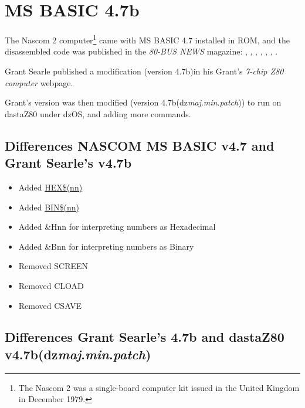 \section{MS BASIC 4.7b}
\label{sub:msbasic}

The Nascom 2 computer\footnote{The Nascom 2 was a single-board computer kit
issued in the United Kingdom in December 1979.} came with MS BASIC 4.7
installed in ROM, and the disassembled code was published in the
\textit{80-BUS NEWS} magazine: \cite{80busnews23}, \cite{80busnews24},
\cite{80busnews25}, \cite{80busnews26}, \cite{80busnews31},
\cite{80busnews32}, \cite{80busnews33}.

Grant Searle published a modification (version 4.7b)in his Grant's \textit{7-chip Z80
computer} webpage\cite{searle2}.

Grant's version was then modified (version 4.7b(dz\textit{maj}.\textit{min}.\textit{patch}))
to run on dastaZ80 under dzOS, and adding more commands.

    \subsection{Differences NASCOM MS BASIC v4.7 and Grant Searle's v4.7b}

    \begin{itemize}
        \item Added \hyperref[msbasic:lang:hex]{HEX\$(nn)}
        \item Added \hyperref[msbasic:lang:hex]{BIN\$(nn)}
        \item Added \&Hnn for interpreting numbers as Hexadecimal
        \item Added \&Bnn for interpreting numbers as Binary
        \item Removed SCREEN
        \item Removed CLOAD
        \item Removed CSAVE
    \end{itemize}

    \subsection{Differences Grant Searle's 4.7b and dastaZ80
    v4.7b(dz\textit{maj}.\textit{min}.\textit{patch})}

